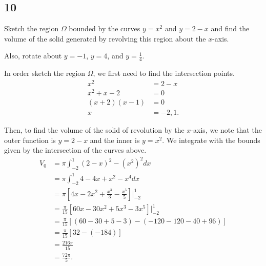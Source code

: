 \documentclass[../hw6.tex]{subfiles}
\begin{document}
\subsection*{10}
Sketch the region $\Omega$ bounded by the curves $y=x^2$ and $y=2-x$ and
find the volume of the solid generated by revolving this region
about the $x$-axis. 

Also, rotate about $y=-1$, $y=4$, and $y=\frac{1}{4}$.

In order sketch the region $\Omega$, we first need to find the intersection points.
\begin{align*}
    x^2&=2-x\\
    x^2+x-2&=0\\
    (x+2)(x-1)&=0\\
    x&=-2,1.
\end{align*}

\begin{figure*}[ht]
\centering
{}
\end{figure*}

Then, to find the volume of the solid of revolution by the $x$-axis, we note that the outer function is $y=2-x$ and the inner is $y=x^2$.
We integrate with the bounds given by the intersection of the curves above.
\begin{align*}
    V_0 &= \pi \int_{-2}^{1} {(2-x)}^2 - {(x^2)}^2 dx \\
    &= \pi \int_{-2}^{1} 4-4x+x^2-x^4 dx \\
    &= \pi \left[ 4x-2x^2+\frac{x^3}{3}-\frac{x^5}{5} \right] \Bigg\vert_{-2}^{1} \\
    &= \frac{\pi}{15} \left[ 60x-30x^2+5x^3-3x^5 \right] \Big\vert_{-2}^{1} \\
    &= \frac{\pi}{15} \left[ (60-30+5-3) - (-120-120-40+96) \right] \\
    &= \frac{\pi}{15} \left[ 32 - (-184) \right] \\
    &= \frac{216 \pi}{15} \\
    &= \frac{72 \pi}{5}. \\
\end{align*}
\end{document}
